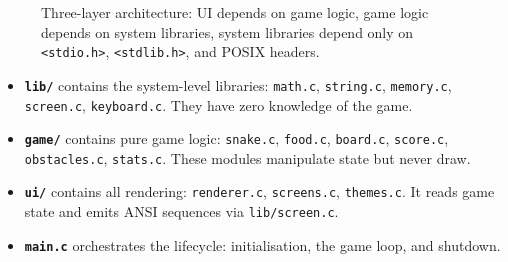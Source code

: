 \documentclass[conference]{IEEEtran}
\begin{document}
\begin{figure}[H]
    \centering
    \caption{Three-layer architecture: UI depends on game logic, game logic depends on system libraries, system libraries depend only on \texttt{<stdio.h>}, \texttt{<stdlib.h>}, and POSIX headers.}
    \label{fig:architecture}
\end{figure}

\begin{itemize}
    \item \textbf{\texttt{lib/}} contains the system-level libraries: \texttt{math.c}, \texttt{string.c}, \texttt{memory.c}, \texttt{screen.c}, \texttt{keyboard.c}. They have zero knowledge of the game.
    \item \textbf{\texttt{game/}} contains pure game logic: \texttt{snake.c}, \texttt{food.c}, \texttt{board.c}, \texttt{score.c}, \texttt{obstacles.c}, \texttt{stats.c}. These modules manipulate state but never draw.
    \item \textbf{\texttt{ui/}} contains all rendering: \texttt{renderer.c}, \texttt{screens.c}, \texttt{themes.c}. It reads game state and emits ANSI sequences via \texttt{lib/screen.c}.
    \item \textbf{\texttt{main.c}} orchestrates the lifecycle: initialisation, the game loop, and shutdown.
\end{itemize}
\end{document}

